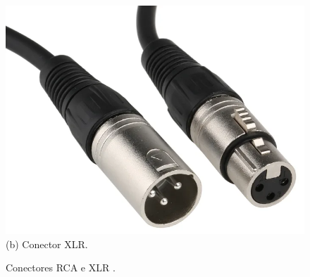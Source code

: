 \begin{figure}[htpb]
\begin{minipage}[t]{0.3\textwidth}
        \includegraphics[width=\textwidth]{figuras/fig23.png}
        \vspace{0.3cm} %
        (b) Conector XLR.
    \end{minipage}

    \caption{Conectores RCA e XLR \cite{rs}.}
    \label{fig22}
\end{figure}










